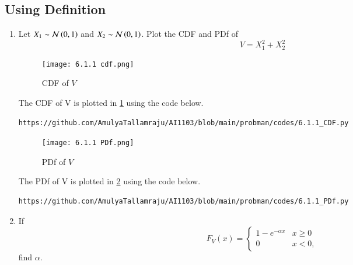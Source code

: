 \documentclass[journal,12pt,twocolumn]{IEEEtran}
\renewcommand\thesection{\arabic{section}}
\renewcommand\thesubsection{\thesection.\arabic{subsection}}
\begin{document}
\subsection{Using Definition}
\begin{enumerate}[label=\thesubsection.\arabic*.,ref=\thesubsection.\theenumi]
%
\item
Let $X_1 \sim \mathcal{N}\left(0,1\right)$ and $X_2 \sim  \mathcal{N}\left(0,1\right)$. Plot the CDF and PDf of
%
\begin{equation}
V = X_1^2 + X_2^2 
\end{equation}
\solution
\begin{figure}[!ht]
\centering
\texttt{[image: 6.1.1 cdf.png]}
\caption{CDF of $V$}
\label{fig:probman_trans_cdf_V}
\end{figure}
The CDF of V is plotted in \ref{fig:probman_trans_cdf_V} using the code below.
\begin{lstlisting}
https://github.com/AmulyaTallamraju/AI1103/blob/main/probman/codes/6.1.1_CDF.py
\end{lstlisting}
\begin{figure}[!ht]
\centering
\texttt{[image: 6.1.1 PDf.png]}
\caption{PDf of $V$}
\label{fig:probman_trans_PDf_V}
\end{figure}
The PDf of V is plotted in \ref{fig:probman_trans_PDf_V} using the code below.
\begin{lstlisting}
https://github.com/AmulyaTallamraju/AI1103/blob/main/probman/codes/6.1.1_PDf.py
\end{lstlisting}


%

\item
If
%
\begin{equation}
F_{V}(x) = 
\begin{cases}
1 - e^{-\alpha x} & x \geq 0 \\
0 & x < 0,
\end{cases}
\label{eq:probman_F_V_alpha}
\end{equation}
%
find $\alpha$.


\end{enumerate}
\end{document}

